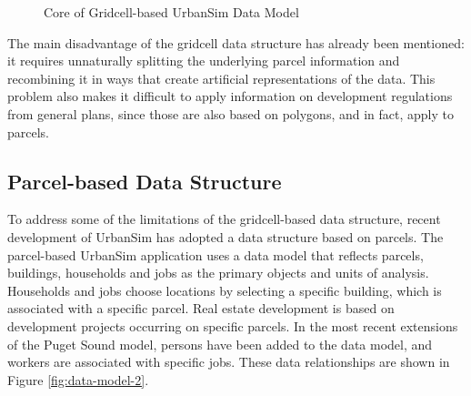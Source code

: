 \begin{figure}[htp]
\center {}
\caption{Core of Gridcell-based UrbanSim Data Model} \label{fig:grid-data-model}
\end{figure}

The main disadvantage of the gridcell data structure has already been mentioned: it requires unnaturally splitting the underlying parcel information and
recombining it in ways that create artificial representations of the data.  This problem also makes it difficult to apply information on development regulations
from general plans, since those are also based on polygons, and in fact, apply to parcels.

\subsection{Parcel-based Data Structure}

To address some of the limitations of the gridcell-based data structure, recent development of UrbanSim has adopted a data structure based on parcels.
The parcel-based UrbanSim application uses a data model that reflects parcels, buildings, households and jobs as the
primary objects and units of analysis.  Households and jobs
choose locations by selecting a specific building, which is associated with a specific parcel.
Real estate development is based on development projects occurring on specific parcels.  In the most recent extensions of the Puget Sound model,
persons have been added to the data model, and workers are associated with specific jobs.  These data relationships
are shown in Figure \ref{fig:data-model-2}.

